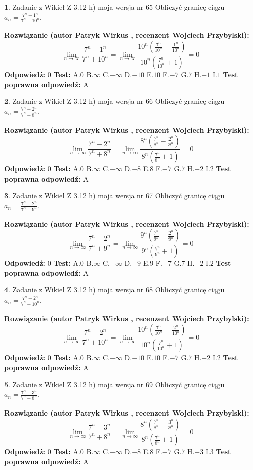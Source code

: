 \documentclass[12pt, a4paper]{article}
\theoremstyle{definition} %
\newtheorem{zad}{}
\newcommand{\zadStart}[1]{\begin{zad}#1\newline}
\newcommand{\zadStop}{\end{zad}}
\newcommand{\rozwStart}[2]{\noindent \textbf{Rozwiązanie (autor #1 , recenzent #2): }\newline}
\newcommand{\rozwStop}{\newline}
\newcommand{\odpStart}{\noindent \textbf{Odpowiedź:}\newline}
\newcommand{\odpStop}{\newline}
\newcommand{\testStart}{\noindent \textbf{Test:}\newline}
\newcommand{\testStop}{\newline}
\newcommand{\kluczStart}{\noindent \textbf{Test poprawna odpowiedź:}\newline}
\newcommand{\kluczStop}{\newline}
\begin{document}
\zadStart{Zadanie z Wikieł Z 3.12 h) moja wersja nr 65}
Obliczyć granicę ciągu $a_{n}=\frac{7^{n} - 1^{n}}{7^{n} + 10^{n}}$.
\zadStop
\rozwStart{Patryk Wirkus}{Wojciech Przybylski}
$$\lim\limits_{n\to\infty}\frac{7^{n} - 1^{n}}{7^{n} + 10^{n}} = \lim\limits_{n\to\infty}\frac{10^{n}(\frac{7^{n}}{10^{n}} - \frac{1^{n}}{10^{n}})}{10^{n}(\frac{7^{n}}{10^{n}} + 1)} = 0$$
\rozwStop
\odpStart
$0$
\odpStop
\testStart
A.$0$
B.$\infty$
C.$-\infty$
D.$-10$
E.$10$
F.$-7$
G.$7$
H.$-1$
I.$1$
\testStop
\kluczStart
A
\kluczStop



\zadStart{Zadanie z Wikieł Z 3.12 h) moja wersja nr 66}
Obliczyć granicę ciągu $a_{n}=\frac{7^{n} - 2^{n}}{7^{n} + 8^{n}}$.
\zadStop
\rozwStart{Patryk Wirkus}{Wojciech Przybylski}
$$\lim\limits_{n\to\infty}\frac{7^{n} - 2^{n}}{7^{n} + 8^{n}} = \lim\limits_{n\to\infty}\frac{8^{n}(\frac{7^{n}}{8^{n}} - \frac{2^{n}}{8^{n}})}{8^{n}(\frac{7^{n}}{8^{n}} + 1)} = 0$$
\rozwStop
\odpStart
$0$
\odpStop
\testStart
A.$0$
B.$\infty$
C.$-\infty$
D.$-8$
E.$8$
F.$-7$
G.$7$
H.$-2$
I.$2$
\testStop
\kluczStart
A
\kluczStop



\zadStart{Zadanie z Wikieł Z 3.12 h) moja wersja nr 67}
Obliczyć granicę ciągu $a_{n}=\frac{7^{n} - 2^{n}}{7^{n} + 9^{n}}$.
\zadStop
\rozwStart{Patryk Wirkus}{Wojciech Przybylski}
$$\lim\limits_{n\to\infty}\frac{7^{n} - 2^{n}}{7^{n} + 9^{n}} = \lim\limits_{n\to\infty}\frac{9^{n}(\frac{7^{n}}{9^{n}} - \frac{2^{n}}{9^{n}})}{9^{n}(\frac{7^{n}}{9^{n}} + 1)} = 0$$
\rozwStop
\odpStart
$0$
\odpStop
\testStart
A.$0$
B.$\infty$
C.$-\infty$
D.$-9$
E.$9$
F.$-7$
G.$7$
H.$-2$
I.$2$
\testStop
\kluczStart
A
\kluczStop



\zadStart{Zadanie z Wikieł Z 3.12 h) moja wersja nr 68}
Obliczyć granicę ciągu $a_{n}=\frac{7^{n} - 2^{n}}{7^{n} + 10^{n}}$.
\zadStop
\rozwStart{Patryk Wirkus}{Wojciech Przybylski}
$$\lim\limits_{n\to\infty}\frac{7^{n} - 2^{n}}{7^{n} + 10^{n}} = \lim\limits_{n\to\infty}\frac{10^{n}(\frac{7^{n}}{10^{n}} - \frac{2^{n}}{10^{n}})}{10^{n}(\frac{7^{n}}{10^{n}} + 1)} = 0$$
\rozwStop
\odpStart
$0$
\odpStop
\testStart
A.$0$
B.$\infty$
C.$-\infty$
D.$-10$
E.$10$
F.$-7$
G.$7$
H.$-2$
I.$2$
\testStop
\kluczStart
A
\kluczStop



\zadStart{Zadanie z Wikieł Z 3.12 h) moja wersja nr 69}
Obliczyć granicę ciągu $a_{n}=\frac{7^{n} - 3^{n}}{7^{n} + 8^{n}}$.
\zadStop
\rozwStart{Patryk Wirkus}{Wojciech Przybylski}
$$\lim\limits_{n\to\infty}\frac{7^{n} - 3^{n}}{7^{n} + 8^{n}} = \lim\limits_{n\to\infty}\frac{8^{n}(\frac{7^{n}}{8^{n}} - \frac{3^{n}}{8^{n}})}{8^{n}(\frac{7^{n}}{8^{n}} + 1)} = 0$$
\rozwStop
\odpStart
$0$
\odpStop
\testStart
A.$0$
B.$\infty$
C.$-\infty$
D.$-8$
E.$8$
F.$-7$
G.$7$
H.$-3$
I.$3$
\testStop
\kluczStart
A
\kluczStop
\end{document}
